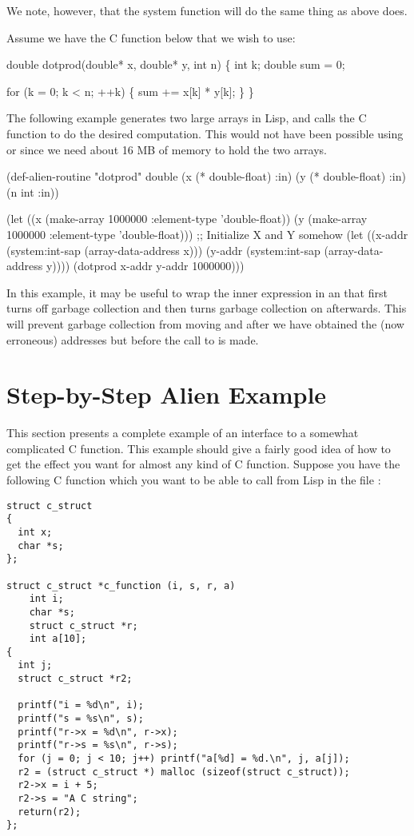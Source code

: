 We note, however, that the system function
 will do the same thing as above does.

Assume we have the C function below that we wish to use:

\begin{example}
  double dotprod(double* x, double* y, int n)
  \{
    int k;
    double sum = 0;

    for (k = 0; k < n; ++k) \{
      sum += x[k] * y[k];
    \}
  \}
\end{example}

The following example generates two large arrays in Lisp, and calls the C
function to do the desired computation.  This would not have been
possible using  or  since we need about
16 MB of memory to hold the two arrays.

\begin{example}
  (def-alien-routine "dotprod" double
    (x (* double-float) :in)
    (y (* double-float) :in)
    (n int :in))
    
  (let ((x (make-array 1000000 :element-type 'double-float))
        (y (make-array 1000000 :element-type 'double-float)))
    ;; Initialize X and Y somehow
    (let ((x-addr (system:int-sap (array-data-address x)))
          (y-addr (system:int-sap (array-data-address y))))
      (dotprod x-addr y-addr 1000000)))    
\end{example}

In this example, it may be useful to wrap the inner 
expression in an  that first turns off garbage
collection and then turns garbage collection on afterwards.  This will
prevent garbage collection from moving  and  after we
have obtained the (now erroneous) addresses but before the call to
 is made.


\section{Step-by-Step Alien Example}

This section presents a complete example of an interface to a somewhat
complicated C function.  This example should give a fairly good idea
of how to get the effect you want for almost any kind of C function.
Suppose you have the following C function which you want to be able to
call from Lisp in the file :

\begin{verbatim}                
struct c_struct
{
  int x;
  char *s;
};
 
struct c_struct *c_function (i, s, r, a)
    int i;
    char *s;
    struct c_struct *r;
    int a[10];
{
  int j;
  struct c_struct *r2;
 
  printf("i = %d\n", i);
  printf("s = %s\n", s);
  printf("r->x = %d\n", r->x);
  printf("r->s = %s\n", r->s);
  for (j = 0; j < 10; j++) printf("a[%d] = %d.\n", j, a[j]);
  r2 = (struct c_struct *) malloc (sizeof(struct c_struct));
  r2->x = i + 5;
  r2->s = "A C string";
  return(r2);
};
\end{verbatim}

